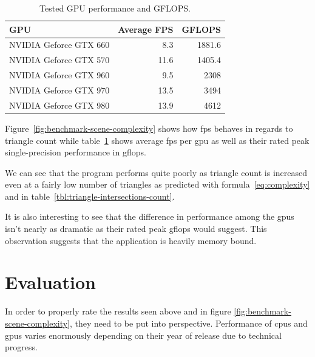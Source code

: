 \documentclass[
  twoside,
  11pt, a4paper,
  footinclude=true,
  headinclude=true,
  cleardoublepage=empty
]{scrreprt}
\begin{document}
\begin{minipage}{\textwidth}
    \begin{table}[H]
        \centering
        \begin{tabular}{l | r | r}
            GPU                     & Average FPS   & GFLOPS \\ \hline
            NVIDIA Geforce GTX 660  & 8.3           & 1881.6 \\
            NVIDIA Geforce GTX 570  & 11.6          & 1405.4 \\
            NVIDIA Geforce GTX 960  & 9.5           & 2308   \\
            NVIDIA Geforce GTX 970  & 13.5          & 3494   \\
            NVIDIA Geforce GTX 980  & 13.9          & 4612
        \end{tabular}
        \caption{Tested GPU performance and GFLOPS.}
        \label{tbl:benchmark-table}
    \end{table}
\end{minipage}

Figure~\ref{fig:benchmark-scene-complexity} shows how \ac{fps} behaves in regards to triangle
count while table~\ref{tbl:benchmark-table} shows average \ac{fps} per \ac{gpu} as well as their
rated peak single-precision performance in \ac{gflops}.

We can see that the program performs quite poorly as triangle count is increased even at a
fairly low number of triangles as predicted with formula~\ref{eq:complexity} and in
table~\ref{tbl:triangle-intersections-count}.

It is also interesting to see that the difference in performance among the \acp{gpu} isn't nearly
as dramatic as their rated peak \ac{gflops} would suggest. This observation suggests that the
application is heavily memory bound.

\clearpage
\section{Evaluation}
In order to properly rate the results seen above and in figure \ref{fig:benchmark-scene-complexity},
they need to be put into perspective. Performance
of \acp{cpu} and \acp{gpu} varies enormously depending on their year of release due to technical
progress.
\end{document}
